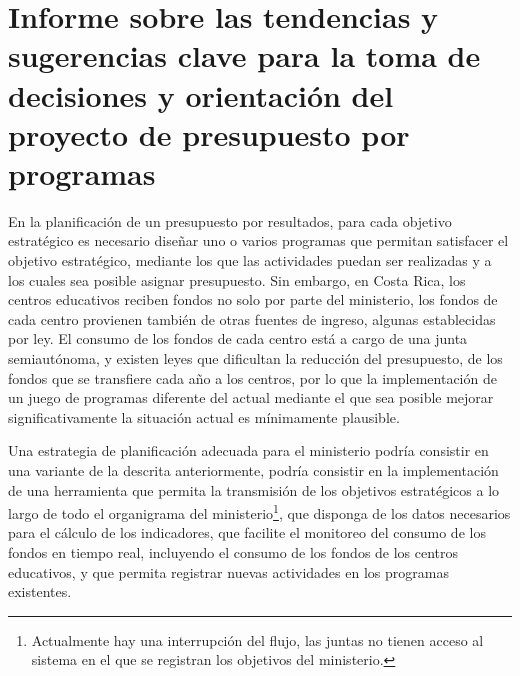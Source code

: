 \documentclass[a4paper, 9pt, conference]{article}
\begin{document}

\section{Informe sobre las tendencias y sugerencias clave para la toma de decisiones y orientaci\'on del proyecto de presupuesto por programas}

En la planificaci\'on de un presupuesto por resultados, para cada objetivo estrat\'egico es necesario dise\~nar uno o varios programas que permitan satisfacer el objetivo estrat\'egico, mediante los que las actividades puedan ser realizadas y a los cuales sea posible asignar presupuesto. Sin embargo, en Costa Rica, los centros educativos reciben fondos no solo por parte del ministerio, los fondos de cada centro provienen tambi\'en de otras fuentes de ingreso, algunas establecidas por ley. El consumo de los fondos de cada centro est\'a a cargo de una junta semiaut\'onoma, y existen leyes que dificultan la reducci\'on del presupuesto, de los fondos que se transfiere cada a\~no a los centros, por lo que la implementaci\'on de un juego de programas diferente del actual mediante el que sea posible mejorar significativamente la situaci\'on actual es m\'inimamente plausible.

Una estrategia de planificaci\'on adecuada para el ministerio podr\'ia consistir en una variante de la descrita anteriormente, podr\'ia consistir en la implementaci\'on de una herramienta que permita la transmisi\'on de los objetivos estrat\'egicos a lo largo de todo el organigrama del ministerio\footnote{Actualmente hay una interrupci\'on del flujo, las juntas no tienen acceso al sistema en el que se registran los objetivos del ministerio.}, que disponga de los datos necesarios para el c\'alculo de los indicadores, que facilite el monitoreo del consumo de los fondos en tiempo real, incluyendo el consumo de los fondos de los centros educativos, y que permita registrar nuevas actividades en los programas existentes.
\end{document}
